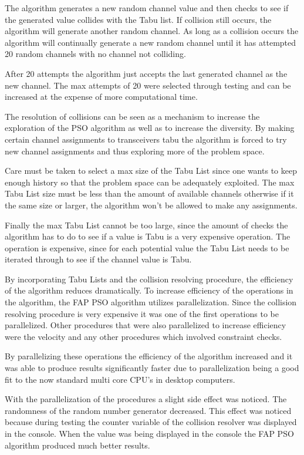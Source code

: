 The algorithm generates a new random channel value and then checks to see if the generated value collides with the Tabu list. If collision still occurs, the algorithm will generate another random channel. As long as a collision occurs the algorithm will continually generate a new random channel until it has attempted 20 random channels with no channel not colliding. 

After 20 attempts the algorithm just accepts the last generated channel as the new channel. The max attempts of 20 were selected through testing and can be increased at the expense of more computational time. 

The resolution of collisions can be seen as a mechanism to increase the exploration of the PSO algorithm as well as to increase the diversity. By making certain channel assignments to transceivers tabu the algorithm is forced to try new channel assignments and thus exploring more of the problem space.

Care must be taken to select a max size of the Tabu List since one wants to keep enough history so that the problem space can be adequately exploited. The max Tabu List size must be less than the amount of available channels otherwise if it the same size or larger, the algorithm won't be allowed to make any assignments. 

Finally the max Tabu List cannot be too large, since the amount of checks the algorithm has to do to see if a value is Tabu is a very expensive operation. The operation is expensive, since for each potential value the Tabu List needs to be iterated through to see if the channel value is Tabu.

By incorporating Tabu Lists and the collision resolving procedure, the efficiency of the algorithm reduces dramatically. To increase efficiency of the operations in the algorithm, the FAP PSO algorithm utilizes parallelization. Since the collision resolving procedure is very expensive it was one of the first operations to be parallelized. Other procedures that were also parallelized to increase efficiency were the velocity and any other procedures which involved constraint checks.

By parallelizing these operations the efficiency of the algorithm increased and it was able to produce results significantly faster due to parallelization being a good fit to the now standard multi core CPU's in desktop computers.

With the parallelization of the procedures a slight side effect was noticed. The randomness of the random number generator decreased. This effect was noticed because during testing the counter variable of the collision resolver was displayed in the console. When the value was being displayed in the console the FAP PSO algorithm produced much better results. 

